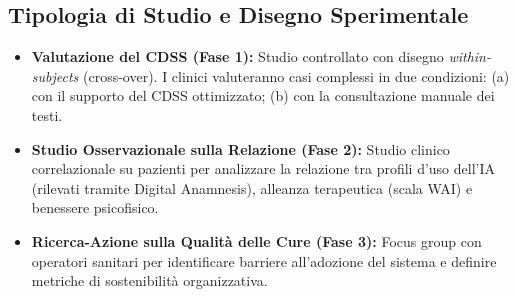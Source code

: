 \documentclass[11pt,a4paper]{article}
\begin{document}
\subsection{Tipologia di Studio e Disegno Sperimentale}
\begin{itemize}
    \item \textbf{Valutazione del CDSS (Fase 1):} Studio controllato con disegno \textit{within-subjects} (cross-over). I clinici valuteranno casi complessi in due condizioni: (a) con il supporto del CDSS ottimizzato; (b) con la consultazione manuale dei testi.
    \item \textbf{Studio Osservazionale sulla Relazione (Fase 2):} Studio clinico correlazionale su pazienti per analizzare la relazione tra profili d'uso dell'IA (rilevati tramite Digital Anamnesis), alleanza terapeutica (scala WAI) e benessere psicofisico.
    \item \textbf{Ricerca-Azione sulla Qualità delle Cure (Fase 3):} Focus group con operatori sanitari per identificare barriere all'adozione del sistema e definire metriche di sostenibilità organizzativa.
\end{itemize}
\end{document}
